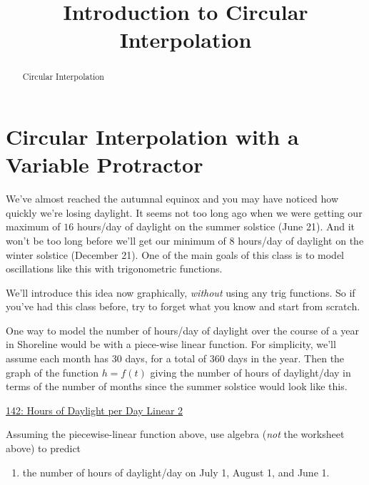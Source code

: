 \documentclass{ximera}
\title{Introduction to Circular Interpolation}
\begin{document}
\begin{abstract}
Circular Interpolation
\end{abstract}
\maketitle

\section{Circular Interpolation with a Variable Protractor}


\begin{example}  \label{Ex:KDreDFerdfdsa}
We've almost reached the autumnal equinox and you may have noticed how quickly we're losing daylight. It seems not too long ago when we were getting our maximum of $16$ hours/day of daylight on the summer solstice (June 21). And it won't be too long before we'll get our minimum of $8$ hours/day of daylight on the winter solstice (December 21). One of the main goals of this class is to model oscillations like this with trigonometric functions.

We'll introduce this idea now graphically, \emph{without} using any trig functions. So if you've had this class before, try to forget what you know and start from scratch.

One way to model the number of hours/day of daylight over the course of a year in Shoreline would be with a piece-wise linear function. For simplicity, we'll assume each month has 30 days, for a total of 360 days in the year. Then the graph of the function $h=f(t)$ giving the number of hours of daylight/day in terms of the number of months since the summer solstice would look like this.

\begin{onlineOnly}
    \begin{center}
\end{center}
\end{onlineOnly}

\href{https://www.desmos.com/calculator/swvhkxim4w}{142: Hours of Daylight per Day Linear 2}

\begin{question}  \label{Q98dfrdedsfdsf}

Assuming the piecewise-linear function above, use algebra (\emph{not} the worksheet above) to predict 
\begin{enumerate}
\item the number of hours of daylight/day on July 1, August 1, and June 1.


\end{enumerate}
\end{question}
\end{example}
\end{document}
